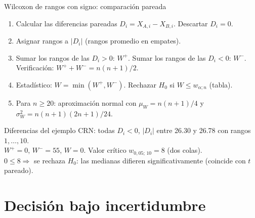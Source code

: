 \documentclass[aspectratio=1610, 10pt]{beamer}
\begin{document}
\begin{frame}{Wilcoxon de rangos con signo: comparación pareada}
\begin{metodobox}[Procedimiento]
\begin{enumerate}
\item Calcular las diferencias pareadas $D_i = X_{A,i} - X_{B,i}$. Descartar $D_i = 0$.
\item Asignar rangos a $|D_i|$ (rangos promedio en empates).
\item Sumar los rangos de las $D_i > 0$: \;$W^+$. \;Sumar los rangos de las $D_i < 0$: \;$W^-$. \;Verificación: $W^+ + W^- = n(n+1)/2$.
\item Estadístico: $W = \min(W^+, W^-)$. Rechazar $H_0$ si $W \le w_{\alpha; n}$ (tabla).
\item Para $n \ge 20$: aproximación normal con $\mu_W = n(n+1)/4$ y $\sigma_W^2 = n(n+1)(2n+1)/24$.
\end{enumerate}
\end{metodobox}

\vspace{0.2cm}
\begin{ejemplobox}
Diferencias del ejemplo CRN: todas $D_i < 0$, $|D_i|$ entre 26.30 y 26.78 con rangos $1,\ldots,10$. \\
$W^+ = 0$, $W^- = 55$, $W = 0$. Valor crítico $w_{0{,}05;\,10} = 8$ (dos colas). \\
$0 \le 8 \Rightarrow$ se rechaza $H_0$: las medianas difieren significativamente \textcolor{deepgreen}{(coincide con $t$ pareado)}.
\end{ejemplobox}
\end{frame}

\section{Decisión bajo incertidumbre}
\end{document}
